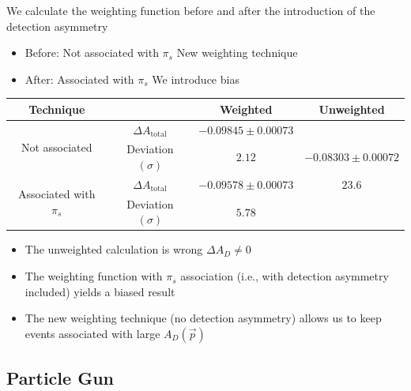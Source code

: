 \documentclass{beamer}
\begin{document}
\begin{frame}
      \frametitle{\insertsubsectionhead}
      \rightarrow We calculate the weighting function before and after the introduction of the detection asymmetry
      \begin{itemize}
            \item Before: Not associated with $\pi_s$ \Rightarrow New weighting technique
            \item After: Associated with $\pi_s$ \Rightarrow We introduce bias
      \end{itemize}
      \begin{center}
            \scriptsize
            \begin{tabular}{c|c|c|c}
                  Technique& & Weighted & Unweighted\\
                  \hline\hline
                  \multirow{2}{*}{Not associated} & $\Delta A_\text{total}$ & $-0.09845 \pm 0.00073$ & \\
                  & Deviation $(\sigma)$ & $2.12$ & $-0.08303 \pm 0.00072$\\
                  \cline{1-3}
                  \multirow{2}{*}{Associated with $\pi_s$} & $\Delta A_\text{total}$ & $-0.09578 \pm 0.00073$ & $23.6$\\
                  & Deviation $(\sigma)$ & $5.78$ & \\
          \end{tabular}
    \end{center}
    \normalsize
    \begin{itemize}
      \item The unweighted calculation is wrong \rightarrow $\Delta A_D \neq 0$
      \item The weighting function with $\pi_s$ association (i.e., with detection asymmetry included) yields a biased result
      \item The new weighting technique (no detection asymmetry) allows us to keep events associated with large $A_D(\vec{p})$ 
    \end{itemize}
\end{frame}

\subsection{Particle Gun}
\end{document}
